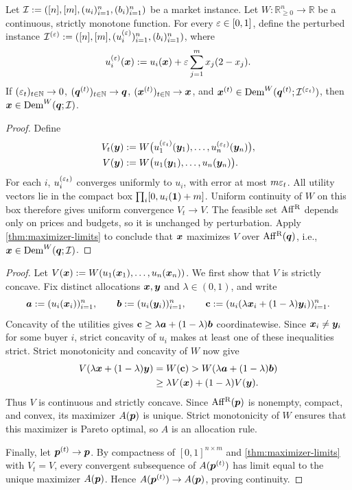 \begin{lemma}
\label{thm:demand-limit-rival}
Let $\mathcal{I} := ([n], [m], (u_i)_{i=1}^n, (b_i)_{i=1}^n)$ be a market instance.
Let $W: \mathbb{R}_{\ge 0}^n \to \mathbb{R}$ be a continuous, strictly monotone function.
For every $\varepsilon \in [0, 1]$, define the perturbed instance
$\mathcal{I}^{(\varepsilon)} := ([n], [m], (u_i^{(\varepsilon)})_{i=1}^n, (b_i)_{i=1}^n)$, where
\[ u_i^{(\varepsilon)}(\bm{x}) := u_i(\bm{x}) + \varepsilon \sum_{j=1}^m x_j(2 - x_j). \]
If $(\varepsilon_t)_{t \in \mathbb{N}} \to 0$, $(\bm{q}^{(t)})_{t \in \mathbb{N}} \to \bm{q}$, $(\bm{x}^{(t)})_{t \in \mathbb{N}} \to \bm{x}$,
and $\bm{x}^{(t)} \in \operatorname{Dem}^W(\bm{q}^{(t)}; \mathcal{I}^{(\varepsilon_t)})$, then $\bm{x} \in \operatorname{Dem}^W(\bm{q}; \mathcal{I})$.
\end{lemma}
\begin{proof}
Define
\begin{align*}
V_t(\bm{y}) & := W\bigl(u_1^{(\varepsilon_t)}(\bm{y}_1), \ldots, u_n^{(\varepsilon_t)}(\bm{y}_n)\bigr), \\
V(\bm{y}) & := W\bigl(u_1(\bm{y}_1), \ldots, u_n(\bm{y}_n)\bigr).
\end{align*}
For each $i$, $u_i^{(\varepsilon_t)}$ converges uniformly to $u_i$, with error at most $m\varepsilon_t$.
All utility vectors lie in the compact box $\prod_i [0, u_i(\mathbf{1}) + m]$.
Uniform continuity of $W$ on this box therefore gives uniform convergence $V_t \to V$.
The feasible set $\operatorname{Aff^{\mathrm{R}}}$ depends only on prices and budgets, so it is unchanged by perturbation.
Apply \cref{thm:maximizer-limits} to conclude that $\bm{x}$ maximizes $V$ over $\operatorname{Aff^{\mathrm{R}}}(\bm{q})$,
i.e., $\bm{x} \in \operatorname{Dem}^W(\bm{q}; \mathcal{I})$.
\end{proof}

\thmUniqueRivalDemand*
\begin{proof}
Let $V(\bm{x}) := W(u_1(\bm{x}_1), \ldots, u_n(\bm{x}_n))$.
We first show that $V$ is strictly concave.
Fix distinct allocations $\bm{x}, \bm{y}$ and $\lambda \in (0, 1)$, and write
\[ \bm{a} := (u_i(\bm{x}_i))_{i=1}^n, \qquad
    \bm{b} := (u_i(\bm{y}_i))_{i=1}^n, \qquad
    \mathbf{c} := (u_i(\lambda\bm{x}_i + (1 - \lambda)\bm{y}_i))_{i=1}^n. \]
Concavity of the utilities gives $\mathbf{c} \ge \lambda\bm{a} + (1 - \lambda)\bm{b}$ coordinatewise.
Since $\bm{x}_i \ne \bm{y}_i$ for some buyer $i$, strict concavity of $u_i$
makes at least one of these inequalities strict.
Strict monotonicity and concavity of $W$ now give
\begin{align*}
V(\lambda\bm{x} + (1 - \lambda)\bm{y})
    & = W(\mathbf{c}) > W(\lambda\bm{a} + (1 - \lambda)\bm{b}) \\
    & \ge \lambda V(\bm{x}) + (1 - \lambda)V(\bm{y}).
\end{align*}
Thus $V$ is continuous and strictly concave.
Since $\operatorname{Aff^{\mathrm{R}}}(\bm{p})$ is nonempty, compact, and convex,
its maximizer $A(\bm{p})$ is unique.
Strict monotonicity of $W$ ensures that this maximizer is Pareto optimal,
so $A$ is an allocation rule.

Finally, let $\bm{p}^{(t)} \to \bm{p}$.
By compactness of $[0, 1]^{n \times m}$ and \cref{thm:maximizer-limits} with $V_t = V$,
every convergent subsequence of $A(\bm{p}^{(t)})$ has limit equal to the unique maximizer $A(\bm{p})$.
Hence $A(\bm{p}^{(t)}) \to A(\bm{p})$, proving continuity.
\end{proof}

